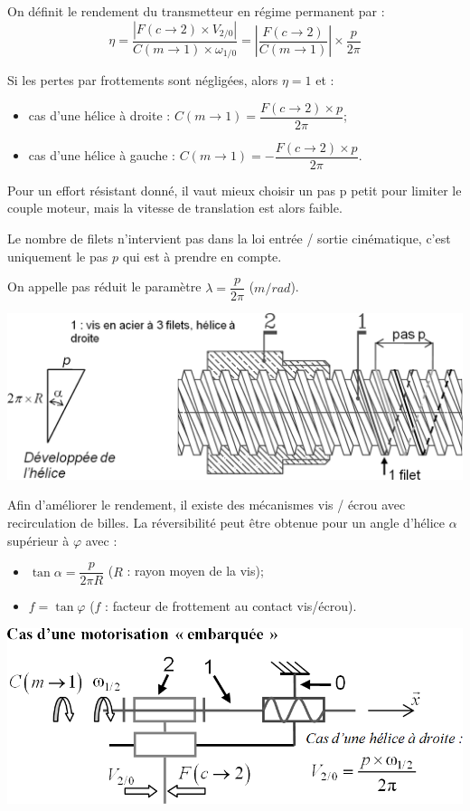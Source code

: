 \documentclass[11pt,oneside]{article}
\begin{document}
On définit le rendement du transmetteur en régime permanent par :
$$
\eta = \dfrac{|F(c\rightarrow 2) \times V_{2/0}|}{C(m\rightarrow 1)\times \omega_{1/0}}=\left| \dfrac{F(c\rightarrow 2)}{C(m\rightarrow 1)}\right|\times \dfrac{p}{2\pi}
$$

Si les pertes par frottements sont négligées, alors $\eta=1$ et :
\begin{itemize}
\item cas d'une hélice à droite : $C(m\rightarrow 1) = \dfrac{F(c\rightarrow 2)\times p}{2\pi}$;
\item cas d'une hélice à gauche : $C(m\rightarrow 1) = -\dfrac{F(c\rightarrow 2)\times p}{2\pi}$.
\end{itemize}

Pour un effort résistant donné, il vaut mieux choisir un pas p petit pour limiter le couple moteur, mais la vitesse de translation est alors faible.

Le nombre de filets n’intervient pas dans la loi entrée / sortie cinématique, c’est uniquement le pas $p$ qui est à prendre en compte.

On appelle pas réduit le paramètre $\lambda = \dfrac{p}{2\pi}$ ($m/rad$).


\begin{center}
\includegraphics[width=.8\textwidth]{png/fig_102}
\end{center}

Afin d’améliorer le rendement, il existe des mécanismes vis / écrou avec recirculation de billes.
La réversibilité peut être obtenue pour un angle d’hélice $\alpha$ supérieur à $\varphi$ avec :
\begin{itemize}
\item $\tan\alpha=\dfrac{p}{2\pi R}$ ($R$ : rayon moyen de la vis);
\item $f=\tan \varphi$ ($f$ : facteur de frottement au contact vis/écrou).
\end{itemize}

\begin{center}
\includegraphics[width=.8\textwidth]{png/fig_103}
\end{center}
\end{document}
